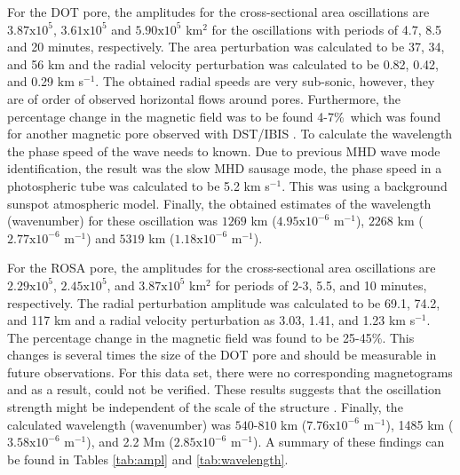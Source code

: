     For the DOT pore, the amplitudes for the cross-sectional area oscillations are $3.87\mathrm{x}10^5$, $3.61\mathrm{x}10^5$ and $5.90\mathrm{x}10^5$ km$^2$ for the oscillations with periods of 4.7, 8.5 and 20 minutes, respectively.
    The area perturbation was calculated to be 37, 34, and 56 km and the radial velocity perturbation was calculated to be 0.82, 0.42, and 0.29 km s$^{-1}$.
    The obtained radial speeds are very sub-sonic, however, they are of order of observed horizontal flows around pores.
    Furthermore, the percentage change in the magnetic field was to be found 4-7\%\ which was found for another magnetic pore observed with DST/IBIS \citep{0004-637X-806-1-132}.
    To calculate the wavelength the phase speed of the wave needs to known.
    Due to previous MHD wave mode identification, the result was the slow MHD sausage mode, the phase speed in a photospheric tube was calculated to be 5.2 km s$^{-1}$.
    This was using a background sunspot atmospheric model.
    Finally, the obtained estimates of the wavelength (wavenumber) for these oscillation was $1269$ km ($4.95\mathrm{x}10^{-6}$ m$^{-1}$), $2268$ km ($2.77\mathrm{x}10^{-6}$ m$^{-1}$) and $5319$ km ($1.18\mathrm{x}10^{-6}$ m$^{-1}$).
       
	For the ROSA pore, the amplitudes for the cross-sectional area oscillations are $2.29\mathrm{x}10^5$, $2.45\mathrm{x}10^5$, and $3.87\mathrm{x}10^5$ km$^2$ for periods of 2-3, 5.5, and 10 minutes, respectively.
    The radial perturbation amplitude was calculated to be 69.1, 74.2, and 117 km and a radial velocity perturbation as 3.03, 1.41, and 1.23 km s$^{-1}$.
    The percentage change in the magnetic field was found to be  25-45\%.
    This changes is several times the size of the DOT pore and should be measurable in future observations. 
    For this data set, there were no corresponding magnetograms and as a result, could not be verified.
    These results suggests that the oscillation strength might be independent of the scale of the structure \citep{Dorotovic2014}. 
    Finally, the calculated wavelength (wavenumber) was $540$-$810$ km ($7.76\mathrm{x}10^{-6}$ m$^{-1}$), 1485 km ($3.58\mathrm{x}10^{-6}$ m$^{-1}$), and 2.2 Mm ($2.85\mathrm{x}10^{-6}$ m$^{-1}$).
    A summary of these findings can be found in Tables \ref{tab:ampl} and \ref{tab:wavelength}.
      
